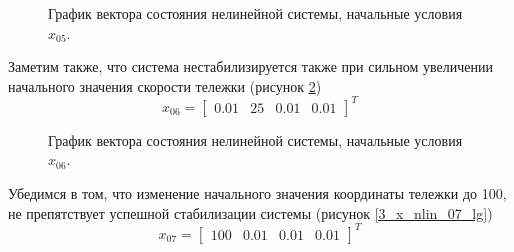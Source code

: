 \begin{figure}[!h]
\caption{График вектора состояния нелинейной системы, начальные условия $x_{05}$.}
\label{3_x_nlin_05_lg}
\end{figure}

Заметим также, что система нестабилизируется также при сильном увеличении начального значения скорости тележки (рисунок \ref{3_x_nlin_06_lg}) $$x_{06} = \begin{bmatrix}
    0.01 & 25 & 0.01 & 0.01
\end{bmatrix}^T$$ 

\begin{figure}[!h]
\caption{График вектора состояния нелинейной системы, начальные условия $x_{06}$.}
\label{3_x_nlin_06_lg}
\end{figure}

Убедимся в том, что изменение начального значения координаты тележки до 100, не препятствует успешной стабилизации системы (рисунок \ref{3_x_nlin_07_lg})
$$x_{07} = \begin{bmatrix}
    100 & 0.01 & 0.01 & 0.01
\end{bmatrix}^T$$

